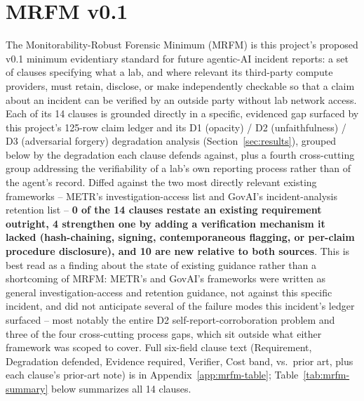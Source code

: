 %
%

\section{MRFM v0.1}
\label{sec:mrfm}

The Monitorability-Robust Forensic Minimum (MRFM) is this project's proposed
v0.1 minimum evidentiary standard for future agentic-AI incident reports: a
set of clauses specifying what a lab, and where relevant its third-party
compute providers, must retain, disclose, or make independently checkable so
that a claim about an incident can be verified by an outside party without
lab network access. Each of its 14 clauses is grounded directly in a
specific, evidenced gap surfaced by this project's 125-row claim ledger and
its D1 (opacity) / D2 (unfaithfulness) / D3 (adversarial forgery) degradation
analysis (Section~\ref{sec:results}), grouped below by the degradation each
clause defends against, plus a fourth cross-cutting group addressing the
verifiability of a lab's own reporting process rather than of the agent's
record. Diffed against the two most directly relevant existing frameworks --
METR's investigation-access list and GovAI's incident-analysis retention
list -- \textbf{0 of the 14 clauses restate an existing requirement
outright, 4 strengthen one by adding a verification mechanism it lacked
(hash-chaining, signing, contemporaneous flagging, or per-claim procedure
disclosure), and 10 are new relative to both sources}. This is best read as a
finding about the state of existing guidance rather than a shortcoming of
MRFM: METR's and GovAI's frameworks were written as general
investigation-access and retention guidance, not against this specific
incident, and did not anticipate several of the failure modes this incident's
ledger surfaced -- most notably the entire D2 self-report-corroboration
problem and three of the four cross-cutting process gaps, which sit outside
what either framework was scoped to cover. Full six-field clause text
(Requirement, Degradation defended, Evidence required, Verifier, Cost band,
vs.\ prior art, plus each clause's prior-art note) is in
Appendix~\ref{app:mrfm-table}; Table~\ref{tab:mrfm-summary} below summarizes
all 14 clauses.

